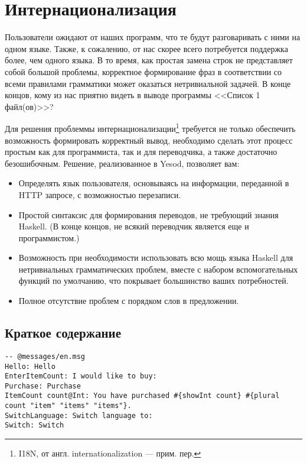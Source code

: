 \chapter{Интернационализация}\label{chap:i18n} %

Пользователи ожидают от наших программ, что те будут разговаривать с ними на одном языке. Также, к сожалению, от нас скорее всего потребуется поддержка более, чем одного языка. В то время, как простая замена строк не представляет собой большой проблемы, корректное формирование фраз в соответствии со всеми правилами грамматики может оказаться нетривиальной задачей. В конце концов, кому из нас приятно видеть в выводе программы <<Список 1 файл(ов)>>?

Для решения проблеммы интернационализации\footnote{I18N, от англ. internationalization --- прим. пер.} требуется не только обеспечить возможность формировать корректный вывод, необходимо сделать этот процесс простым как для программиста, так и для переводчика, а также достаточно безошибочным. Решение, реализованное в Yesod, позволяет вам:

\begin{itemize}
  \item Определять язык пользователя, основываясь на информации, переданной в HTTP запросе, с возможностью перезаписи.
  \item Простой синтаксис для формирования переводов, не требующий знания Haskell. (В конце концов, не всякий переводчик является еще и программистом.)
  \item Возможность при необходимости использовать всю мощь языка Haskell для нетривиальных грамматических проблем, вместе с набором вспомогательных функций по умолчанию, что покрывает большинство ваших потребностей.
  \item Полное отсутствие проблем с порядком слов в предложении. %
\end{itemize}

\section{Краткое содержание} %

\begin{lstlisting}
-- @messages/en.msg
Hello: Hello
EnterItemCount: I would like to buy: 
Purchase: Purchase
ItemCount count@Int: You have purchased #{showInt count} #{plural count "item" "items" "items"}.
SwitchLanguage: Switch language to: 
Switch: Switch
\end{lstlisting}


